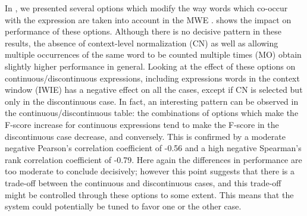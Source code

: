 \documentclass[output=paper,modfonts,nonflat]{langsci/langscibook}
\begin{document}
In , we presented several options
which modify the way words which co-occur with the expression are
taken into account in the MWE . 
 shows the impact on performance of these
options. Although there is no decisive pattern in these results, the
absence of context-level normalization (CN) as well as allowing
multiple occurrences of the same word to be counted multiple times
(MO) obtain slightly higher performance in general. Looking at the
effect of these options on continuous/discontinuous expressions,
including expressions words in the context window (IWIE) has a
negative effect on all the cases, except if CN is selected but only in
the discontinuous case. In fact, an interesting pattern can be
observed in the continuous/discontinuous table: the combinations of
options which make the F-score increase for continuous expressions
tend to make the F-score in the discontinuous case decrease, and
conversely. This is confirmed by a moderate negative Pearson's
correlation coefficient of -0.56 and a high negative Spearman's rank
correlation coefficient of -0.79. Here again the differences in
performance are too moderate to conclude decisively; however this
point suggests that there is a trade-off between the continuous and
discontinuous cases, and this trade-off might be controlled through
these options to some extent. This means that the system could
potentially be tuned to favor one or the other case.


%
%





\end{document}
